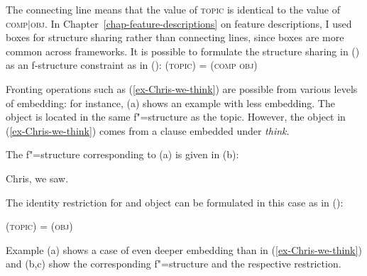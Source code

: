 \noindent
The connecting line means that the value of \textsc{topic} is identical to the value of
\textsc{comp$|$obj}. In Chapter~\ref{chap-feature-descriptions} on feature descriptions, I used boxes for structure sharing
rather than connecting lines, since boxes are more common across frameworks.
It is possible to formulate the structure sharing in () as an f-structure constraint as in ():
\ea
\label{Topic-Comp-Obj}
(\upsp  \textsc{topic}) = (\upsp \textsc{comp obj})
\z

\noindent
Fronting operations such as (\ref{ex-Chris-we-think}) are possible from various levels of embedding:
for instance, (a) shows an example with less embedding.
The object is located in the same f"=structure as the topic. However, the object in (\ref{ex-Chris-we-think}) comes from a clause embedded under \emph{think}.

The f"=structure corresponding to (a) is given in (b):

\eal
\ex Chris, we saw.
\ex 
{}
\zl

\noindent
The identity restriction for \topic{} and object can be formulated in this case as in ():

\ea
\label{Topic-Obj}
(\upsp  \textsc{topic}) = (\upsp \textsc{obj})
\z

\noindent
Example (a) shows a case of even deeper embedding than in (\ref{ex-Chris-we-think}) and
(b,c) show the corresponding f"=structure and the respective restriction.

